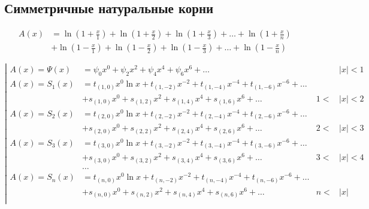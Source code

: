 
\subsection{Симметричные натуральные корни}

\begin{equation*} \begin{aligned}
A(x) &=
  \ln{\left(1 + \frac{x}{1} \right)}
+ \ln{\left(1 + \frac{x}{2} \right)}
+ \ln{\left(1 + \frac{x}{3} \right)}
+ \ldots
+ \ln{\left(1 + \frac{x}{n} \right)} \\ &
+ \ln{\left(1 - \frac{x}{1} \right)}
+ \ln{\left(1 - \frac{x}{2} \right)}
+ \ln{\left(1 - \frac{x}{3} \right)}
+ \ldots
+ \ln{\left(1 - \frac{x}{n} \right)}
\end{aligned} \end{equation*}

\begin{equation*} \left| \begin{aligned}
A(x) = \Psi(x) &=
  \psi_0 x^0
+ \psi_2 x^2
+ \psi_4 x^4
+ \psi_6 x^6
+ \ldots &
&|x| < 1 \\
%
A(x) = S_1(x) &= 
  t_{(1,0)} x^0 \ln{x}
+ t_{(1,-2)} x^{-2}
+ t_{(1,-4)} x^{-4}
+ t_{(1,-6)} x^{-6}
+ \ldots \\ &
+ s_{(1,0)} x^0
+ s_{(1,2)} x^2
+ s_{(1,4)} x^4
+ s_{(1,6)} x^6
+ \ldots &
1 < &|x| < 2 \\
%
A(x) = S_2(x) &= 
  t_{(2,0)} x^0 \ln{x}
+ t_{(2,-2)} x^{-2}
+ t_{(2,-4)} x^{-4}
+ t_{(2,-6)} x^{-6}
+ \ldots \\ &
+ s_{(2,0)} x^0
+ s_{(2,2)} x^2
+ s_{(2,4)} x^4
+ s_{(2,6)} x^6
+ \ldots &
2 < &|x| < 3 \\
%
A(x) = S_3(x) &= 
  t_{(3,0)} x^0 \ln{x}
+ t_{(3,-2)} x^{-2}
+ t_{(3,-4)} x^{-4}
+ t_{(3,-6)} x^{-6}
+ \ldots \\ &
+ s_{(3,0)} x^0
+ s_{(3,2)} x^2
+ s_{(3,4)} x^4
+ s_{(3,6)} x^6
+ \ldots &
3 < &|x| < 4 \\
%
&\ldots \\
%
A(x) = S_n(x) &= 
  t_{(n,0)} x^0 \ln{x}
+ t_{(n,-2)} x^{-2}
+ t_{(n,-4)} x^{-4}
+ t_{(n,-6)} x^{-6}
+ \ldots \\ &
+ s_{(n,0)} x^0
+ s_{(n,2)} x^2
+ s_{(n,4)} x^4
+ s_{(n,6)} x^6
+ \ldots &
n < &|x| \\
\end{aligned} \right. \end{equation*}

